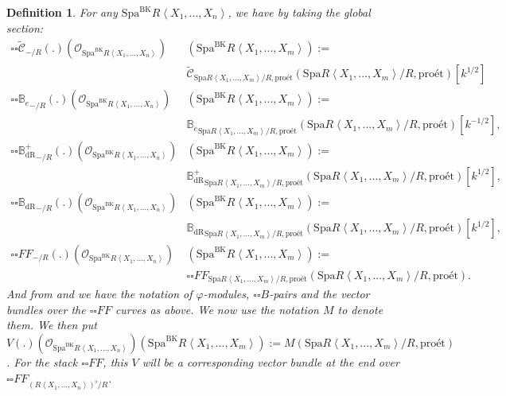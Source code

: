 \documentclass[12pt]{book}
\newtheorem{definition}{Definition}
\begin{document}
\begin{definition}
For any $\mathrm{Spa}^\mathrm{BK}R\left<X_1,...,X_n\right>$, we have by taking the global section:
\begin{align}
{\square\square}\widetilde{\mathcal{C}}_{-/R}(.)(\mathcal{O}_{\mathrm{Spa}^\mathrm{BK}R\left<X_1,...,X_n\right>})&(\mathrm{Spa}^\mathrm{BK}R\left<X_1,...,X_m\right>):=\\
&\widetilde{\mathcal{C}}_{\mathrm{Spa}R\left<X_1,...,X_m\right>/R,\text{pro\'et}}(\mathrm{Spa}R\left<X_1,...,X_m\right>/R,\text{pro\'et})[k^{1/2}]\\
{\square\square}{\mathbb{B}_e}_{-/R}(.)(\mathcal{O}_{\mathrm{Spa}^\mathrm{BK}R\left<X_1,...,X_n\right>})&(\mathrm{Spa}^\mathrm{BK}R\left<X_1,...,X_m\right>):=\\
&{\mathbb{B}_e}_{\mathrm{Spa}R\left<X_1,...,X_m\right>/R,\text{pro\'et}}(\mathrm{Spa}R\left<X_1,...,X_m\right>/R,\text{pro\'et})[k^{-1/2}],\\
{\square\square}{\mathbb{B}_\mathrm{dR}^+}_{-/R}(.)(\mathcal{O}_{\mathrm{Spa}^\mathrm{BK}R\left<X_1,...,X_n\right>})&(\mathrm{Spa}^\mathrm{BK}R\left<X_1,...,X_m\right>):=\\
&{\mathbb{B}_\mathrm{dR}^+}_{\mathrm{Spa}R\left<X_1,...,X_m\right>/R,\text{pro\'et}}(\mathrm{Spa}R\left<X_1,...,X_m\right>/R,\text{pro\'et})[k^{1/2}],\\
{\square\square}{\mathbb{B}_\mathrm{dR}}_{-/R}(.)(\mathcal{O}_{\mathrm{Spa}^\mathrm{BK}R\left<X_1,...,X_n\right>})&(\mathrm{Spa}^\mathrm{BK}R\left<X_1,...,X_m\right>):=\\
&{\mathbb{B}_\mathrm{dR}}_{\mathrm{Spa}R\left<X_1,...,X_m\right>/R,\text{pro\'et}}(\mathrm{Spa}R\left<X_1,...,X_m\right>/R,\text{pro\'et})[k^{1/2}],\\
{\square\square}{{FF}}_{-/R}(.)(\mathcal{O}_{\mathrm{Spa}^\mathrm{BK}R\left<X_1,...,X_n\right>})&(\mathrm{Spa}^\mathrm{BK}R\left<X_1,...,X_m\right>):=\\
&{\square\square}{FF}_{\mathrm{Spa}R\left<X_1,...,X_m\right>/R,\text{pro\'et}}(\mathrm{Spa}R\left<X_1,...,X_m\right>/R,\text{pro\'et}).
\end{align}
And from \cite[Definition 9.3.3, Definition 9.3.5, Definition 9.3.11, Definition 9.3.9]{KL1} and \cite{KL2} we have the notation of $\varphi$-modules, ${\square\square}B$-pairs and the vector bundles over the ${\square\square}FF$ curves as above. We now use the notation $M$ to denote them. We then put $V(.)(\mathcal{O}_{\mathrm{Spa}^\mathrm{BK}R\left<X_1,...,X_n\right>})(\mathrm{Spa}^\mathrm{BK}R\left<X_1,...,X_m\right>):=M(\mathrm{Spa}R\left<X_1,...,X_m\right>/R,\text{pro\'et})$. For the stack ${\square\square}FF$, this $V$ will be a corresponding vector bundle at the end over ${\square\square}FF_{(R\left<X_1,...,X_n\right>)^\flat/R}$. 	
\end{definition}
  
\end{document}
